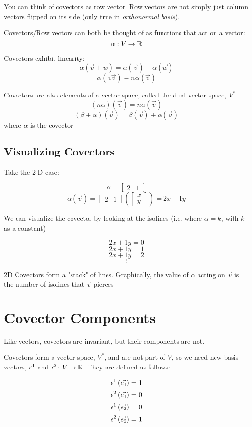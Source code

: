 \documentclass{report}
\begin{document}
You can think of covectors as row vector. Row vectors are not simply just column vectors flipped on its side (only true in \emph{orthonormal basis}).

Covectors/Row vectors can both be thought of as functions that act on a vector:
$$ \alpha : V \to \R $$ 

Covectors exhibit linearity:
$$ \alpha\left( \vec{v} + \vec{w}\right) = \alpha(\vec{v}) + \alpha\left( \vec{w} \right)  $$ 
$$\alpha(n\vec{v}) = n \alpha(\vec{v})$$ 

Covectors are also elements of a vector space, called the dual vector space, $V^*$
$$ \left(n \alpha  \right)(\vec{v}) = n\alpha(\vec{v})  $$ 
$$ \left( \beta + \alpha \right) (\vec{v}) = \beta(\vec{v}) + \alpha(\vec{v})  $$ 
where $\alpha$ is the covector

\section{Visualizing Covectors}
Take the 2-D case:

$$ \alpha = \begin{bmatrix} 2 & 1 \end{bmatrix}  $$ 
$$ \alpha (\vec{v}) = \begin{bmatrix} 2 & 1 \end{bmatrix} \left( \begin{bmatrix} x \\ y \end{bmatrix}  \right)  = 2x + 1y$$ 

We can visualize the covector by looking at the isolines (i.e. where $\alpha = k$, with $k$ as a constant)

$$ 2x + 1y = 0 $$ 
$$ 2x + 1y = 1 $$ 
$$ 2x + 1y = 2 $$ 
$$ \vdots$$ 

2D Covectors form a "stack" of lines. Graphically, the value of $\alpha$ acting on $\vec{v}$ is the number of isolines that $\vec{v}$ pierces

\chapter{Covector Components}
Like vectors, covectors are invariant, but their components are not.

Covectors form a vector space, $V^*$, and are not part of $V$, so we need new basis vectors, $\epsilon^1$ and $\epsilon^2$: $V \to \R$. They are defined as follows:

$$ \epsilon^1\left( \vec{e_1} \right) =1 $$ 
$$ \epsilon^2\left( \vec{e_1} \right) =0 $$ 
$$ \epsilon^1\left( \vec{e_2} \right) =0 $$ 
$$ \epsilon^2\left( \vec{e_2} \right) =1 $$ 
\end{document}
